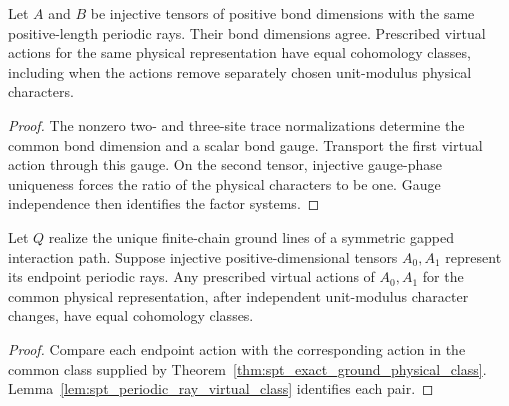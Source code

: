 \begin{lemma}
    \label{lem:spt_periodic_ray_virtual_class}
    \leanok
    Let $A$ and $B$ be injective tensors of positive bond dimensions with
    the same positive-length periodic rays. Their bond dimensions agree.
    Prescribed virtual actions for the same physical representation have
    equal cohomology classes, including when the actions remove separately
    chosen unit-modulus physical characters.
\end{lemma}
\begin{proof}\leanok
    The nonzero two- and three-site trace normalizations determine the
    common bond dimension and a scalar bond gauge. Transport the first
    virtual action through this gauge. On the second tensor, injective
    gauge-phase uniqueness forces the ratio of the physical characters
    to be one. Gauge independence then identifies the factor systems.
\end{proof}

\begin{lemma}
    \label{cor:spt_exact_ground_endpoint_class}
    \leanok
    Let $Q$ realize the unique finite-chain ground lines of a symmetric
    gapped interaction path. Suppose injective positive-dimensional
    tensors $A_0,A_1$ represent its endpoint periodic rays. Any prescribed
    virtual actions of $A_0,A_1$ for the common physical representation,
    after independent unit-modulus character changes, have equal
    cohomology classes.
\end{lemma}
\begin{proof}\leanok
    Compare each endpoint action with the corresponding action in the
    common class supplied by Theorem~\ref{thm:spt_exact_ground_physical_class}.
    Lemma~\ref{lem:spt_periodic_ray_virtual_class} identifies each pair.
\end{proof}

